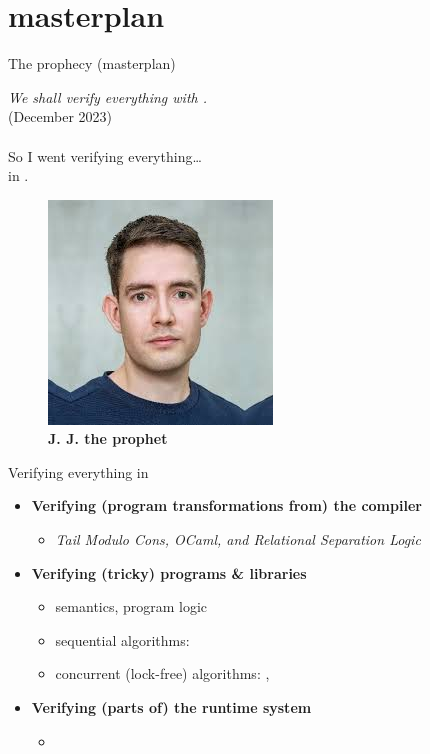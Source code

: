 \section{\Iris masterplan}

\begin{frame}{The prophecy (\Iris masterplan)}
\centering
\Large
\begin{minipage}{0.55\textwidth}
\emph{We shall verify everything with \Iris.} \\
(December 2023) \\\\
So I went verifying everything\dots \\
in \OCaml.
\end{minipage}
\begin{minipage}{0.4\textwidth}
\begin{figure}
  \includegraphics[scale=0.4]{images/jules_jacobs.jpg}
  \caption*{\textbf{J. J. the prophet}}
\end{figure}
\end{minipage}
\end{frame}

\begin{frame}{Verifying everything in \OCaml}
\centering
\large
\begin{itemize}
  \setlength\itemsep{1.5em}
  \item \textbf{Verifying (program transformations from) the compiler}
    \begin{itemize}
      \item \emph{Tail Modulo Cons, OCaml, and Relational Separation Logic}
    \end{itemize}
  \item \textbf{Verifying (tricky) programs \& libraries}
    \begin{itemize}
      \item semantics, program logic
      \item sequential algorithms: \Store
      \item concurrent (lock-free) algorithms: \Saturn, \Kcas
    \end{itemize}
  \item \textbf{Verifying (parts of) the runtime system}
    \begin{itemize}
      \item \Boxroot
    \end{itemize}
\end{itemize}
\end{frame}
